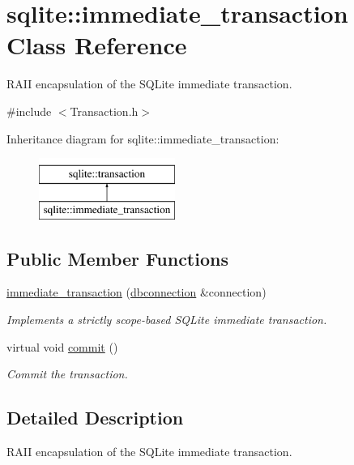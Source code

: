 \hypertarget{a00008}{\section{sqlite\-:\-:immediate\-\_\-transaction Class Reference}
\label{a00008}
}


R\-A\-I\-I encapsulation of the S\-Q\-Lite immediate transaction.  




{\ttfamily \#include $<$Transaction.\-h$>$}

Inheritance diagram for sqlite\-:\-:immediate\-\_\-transaction\-:\begin{figure}[H]
\begin{center}
\leavevmode
\includegraphics[height=2.000000cm]{a00008}
\end{center}
\end{figure}
\subsection*{Public Member Functions}
\begin{DoxyCompactItemize}
\item 
\hyperlink{a00008_a17924d6e15666b8340ee8aab9a88e0d1}{immediate\-\_\-transaction} (\hyperlink{a00004}{dbconnection} \&connection)
\begin{DoxyCompactList}\small\item\em Implements a strictly scope-\/based S\-Q\-Lite immediate transaction. \end{DoxyCompactList}\item 
\hypertarget{a00014_abe219dd0bf949d569381f9830c7b2d1a}{virtual void \hyperlink{a00014_abe219dd0bf949d569381f9830c7b2d1a}{commit} ()}\label{a00014_abe219dd0bf949d569381f9830c7b2d1a}

\begin{DoxyCompactList}\small\item\em Commit the transaction. \end{DoxyCompactList}\end{DoxyCompactItemize}


\subsection{Detailed Description}
R\-A\-I\-I encapsulation of the S\-Q\-Lite immediate transaction. 

